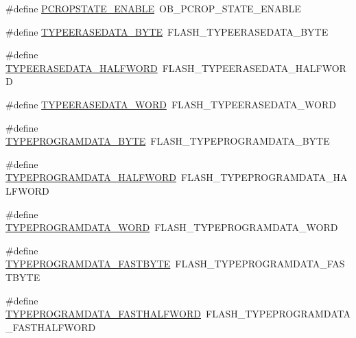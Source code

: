 \begin{DoxyCompactItemize}
\#define \hyperlink{group___h_a_l___f_l_a_s_h___aliased___defines_ga9e086afe58f178c3e86526666bedc217}{P\+C\+R\+O\+P\+S\+T\+A\+T\+E\+\_\+\+E\+N\+A\+B\+LE}~O\+B\+\_\+\+P\+C\+R\+O\+P\+\_\+\+S\+T\+A\+T\+E\+\_\+\+E\+N\+A\+B\+LE
\item 
\#define \hyperlink{group___h_a_l___f_l_a_s_h___aliased___defines_ga4b3d9b5629b76e57da896b4b7f95d3d7}{T\+Y\+P\+E\+E\+R\+A\+S\+E\+D\+A\+T\+A\+\_\+\+B\+Y\+TE}~F\+L\+A\+S\+H\+\_\+\+T\+Y\+P\+E\+E\+R\+A\+S\+E\+D\+A\+T\+A\+\_\+\+B\+Y\+TE
\item 
\#define \hyperlink{group___h_a_l___f_l_a_s_h___aliased___defines_gaaad85877529e61a7d77a294a9cf2d474}{T\+Y\+P\+E\+E\+R\+A\+S\+E\+D\+A\+T\+A\+\_\+\+H\+A\+L\+F\+W\+O\+RD}~F\+L\+A\+S\+H\+\_\+\+T\+Y\+P\+E\+E\+R\+A\+S\+E\+D\+A\+T\+A\+\_\+\+H\+A\+L\+F\+W\+O\+RD
\item 
\#define \hyperlink{group___h_a_l___f_l_a_s_h___aliased___defines_gaf4f4f8533550f97be0c26f73d57c7287}{T\+Y\+P\+E\+E\+R\+A\+S\+E\+D\+A\+T\+A\+\_\+\+W\+O\+RD}~F\+L\+A\+S\+H\+\_\+\+T\+Y\+P\+E\+E\+R\+A\+S\+E\+D\+A\+T\+A\+\_\+\+W\+O\+RD
\item 
\#define \hyperlink{group___h_a_l___f_l_a_s_h___aliased___defines_ga6864697548b848a7fc44453e1a2fb81c}{T\+Y\+P\+E\+P\+R\+O\+G\+R\+A\+M\+D\+A\+T\+A\+\_\+\+B\+Y\+TE}~F\+L\+A\+S\+H\+\_\+\+T\+Y\+P\+E\+P\+R\+O\+G\+R\+A\+M\+D\+A\+T\+A\+\_\+\+B\+Y\+TE
\item 
\#define \hyperlink{group___h_a_l___f_l_a_s_h___aliased___defines_ga0064d23e04c71357067fc6d55c4ef2d1}{T\+Y\+P\+E\+P\+R\+O\+G\+R\+A\+M\+D\+A\+T\+A\+\_\+\+H\+A\+L\+F\+W\+O\+RD}~F\+L\+A\+S\+H\+\_\+\+T\+Y\+P\+E\+P\+R\+O\+G\+R\+A\+M\+D\+A\+T\+A\+\_\+\+H\+A\+L\+F\+W\+O\+RD
\item 
\#define \hyperlink{group___h_a_l___f_l_a_s_h___aliased___defines_ga97f70e9304478e184521f9e9e209fb38}{T\+Y\+P\+E\+P\+R\+O\+G\+R\+A\+M\+D\+A\+T\+A\+\_\+\+W\+O\+RD}~F\+L\+A\+S\+H\+\_\+\+T\+Y\+P\+E\+P\+R\+O\+G\+R\+A\+M\+D\+A\+T\+A\+\_\+\+W\+O\+RD
\item 
\#define \hyperlink{group___h_a_l___f_l_a_s_h___aliased___defines_gabe017e7fb8bbfcb3e2c085ec36a74413}{T\+Y\+P\+E\+P\+R\+O\+G\+R\+A\+M\+D\+A\+T\+A\+\_\+\+F\+A\+S\+T\+B\+Y\+TE}~F\+L\+A\+S\+H\+\_\+\+T\+Y\+P\+E\+P\+R\+O\+G\+R\+A\+M\+D\+A\+T\+A\+\_\+\+F\+A\+S\+T\+B\+Y\+TE
\item 
\#define \hyperlink{group___h_a_l___f_l_a_s_h___aliased___defines_gaa7602be5fde7d3dfbc33cd647ade049f}{T\+Y\+P\+E\+P\+R\+O\+G\+R\+A\+M\+D\+A\+T\+A\+\_\+\+F\+A\+S\+T\+H\+A\+L\+F\+W\+O\+RD}~F\+L\+A\+S\+H\+\_\+\+T\+Y\+P\+E\+P\+R\+O\+G\+R\+A\+M\+D\+A\+T\+A\+\_\+\+F\+A\+S\+T\+H\+A\+L\+F\+W\+O\+RD

\end{DoxyCompactItemize}
